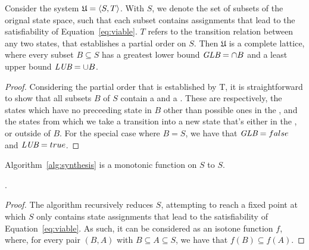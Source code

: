 \begin{lemma} Consider the system
$\mathfrak{U} = \langle S, T \rangle$. With $S$, we denote the set of
subsets of the orignal state space, such that each subset contains assignments that lead to the
satisfiability of Equation~\ref{eq:viable}. $T$ refers to the
transition relation between any two states, that establishes a partial order
on $S$. Then $\mathfrak{U}$ is a complete lattice, where every subset $B \subseteq
S$ has a greatest lower bound  $\textit {GLB} = \cap B$  and a least upper
bound $\textit {LUB} = \cup B$.
\label{lem:lattice}
\end{lemma}
\begin{proof}
Considering the partial order that is established by T, it is straightforward
to show that all subsets $B$ of $S$ contain a \glb and a \lub. These
are respectively, the states which have no preceeding state in $B$ other than
possible ones in the \glb, and the states from which we take a transition into
a new state that's either in the \lub, or outside of $B$. For the special case
where $B = S$, we have that $\textit {GLB} = false$ and $\textit {LUB} = true$.
\end{proof}



\begin{lemma} Algorithm~\ref{alg:synthesis} is a monotonic function on $S$ to
$S$.

.
\label{lem:monotonicity}
\end{lemma}
\begin{proof}
The algorithm recursively reduces $S$, attempting to reach a fixed point
at which $S$ only contains state assignments that lead to the satisfiability of
Equation~\ref{eq:viable}. As such, it can be considered as an isotone function
$f$, where, for every pair $(B,A)$ with $B \subseteq A \subseteq S$, we have that
$f(B) \subseteq f(A)$.
\end{proof}

